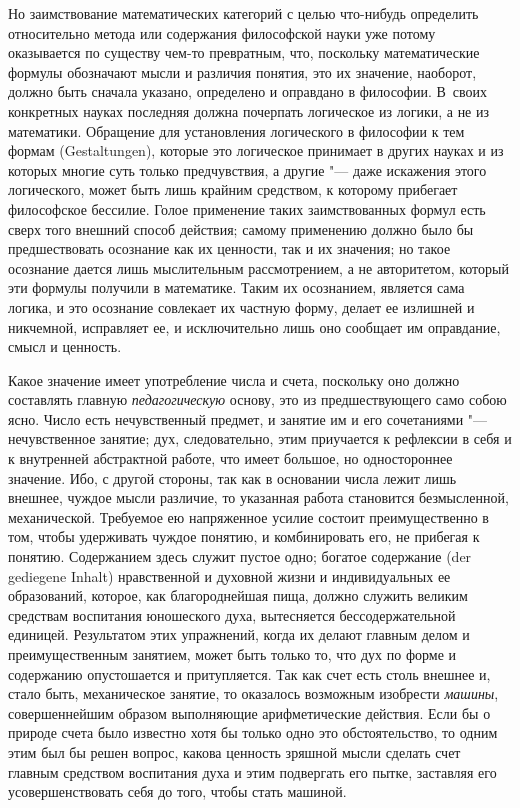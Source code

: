 Но заимствование математических категорий с целью что-нибудь определить
относительно метода или содержания философской науки уже потому оказывается
по существу чем-то превратным, что, поскольку математические формулы
обозначают мысли и различия понятия, это их значение, наоборот, должно быть
сначала указано, определено и оправдано в философии. В~своих конкретных
науках последняя должна почерпать логическое из логики, а не из математики.
Обращение для установления логического в философии к тем формам
(Gestaltungen), которые это логическое принимает в других науках и из
которых многие суть только предчувствия, а другие "--- даже искажения этого
логического, может быть лишь крайним средством, к которому прибегает
философское бессилие. Голое применение таких заимствованных формул есть
сверх того внешний способ действия; самому применению должно было бы
предшествовать осознание как их ценности, так и их значения; но такое
осознание дается лишь мыслительным рассмотрением, а не авторитетом, который
эти формулы получили в математике. Таким их осознанием, является сама
логика, и это осознание совлекает их частную форму, делает ее излишней и
никчемной, исправляет ее, и исключительно лишь оно сообщает им оправдание,
смысл и ценность.

Какое значение имеет употребление числа и счета, поскольку оно должно
составлять главную {\em педагогическую} основу, это из
предшествующего само собою ясно. Число есть нечувственный предмет, и
занятие им и его сочетаниями "--- нечувственное занятие; дух, следовательно,
этим приучается к рефлексии в себя и к внутренней абстрактной работе, что
имеет большое, но одностороннее значение. Ибо, с другой стороны, так как в
основании числа лежит лишь внешнее, чуждое мысли различие, то указанная
работа становится безмысленной, механической. Требуемое ею напряженное
усилие состоит преимущественно в том, чтобы удерживать чуждое понятию, и
комбинировать его, не прибегая к понятию. Содержанием здесь служит пустое
одно; богатое содержание (der gediegene Inhalt) нравственной и духовной
жизни и индивидуальных ее образований, которое, как благороднейшая пища,
должно служить великим средствам воспитания юношеского духа, вытесняется
бессодержательной единицей. Результатом этих упражнений, когда их делают
главным делом и преимущественным занятием, может быть только то, что дух по
форме и содержанию опустошается и притупляется. Так как счет есть столь
внешнее и, стало быть, механическое занятие, то оказалось возможным
изобрести {\em машины}, совершеннейшим образом
выполняющие арифметические действия. Если бы о природе счета было известно
хотя бы только одно это обстоятельство, то одним этим был бы решен вопрос,
какова ценность зряшной мысли сделать счет главным средством воспитания
духа и этим подвергать его пытке, заставляя его усовершенствовать себя до
того, чтобы стать машиной.

